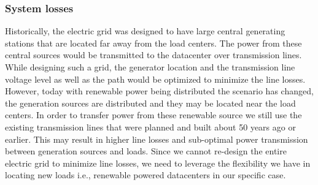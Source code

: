 \subsubsection{System losses}
Historically, the electric grid was designed to have large central generating stations that are located far away from the load centers. The power from these central sources would be transmitted to the datacenter over transmission lines. While designing such a grid, the generator location and the transmission line voltage level as well as the path would be optimized to minimize the line losses.  However, today with renewable power being distributed the scenario has changed, the generation sources are distributed and they may be located near the load centers. In order to transfer power from these renewable source we still use the existing transmission lines that were planned and built about 50 years ago or earlier. This may result in higher line losses and sub-optimal power transmission between generation sources and loads. Since we cannot re-design the entire electric grid to minimize line losses, we need to leverage the flexibility we have in locating new loads i.e., renewable powered datacenters in our specific case.




